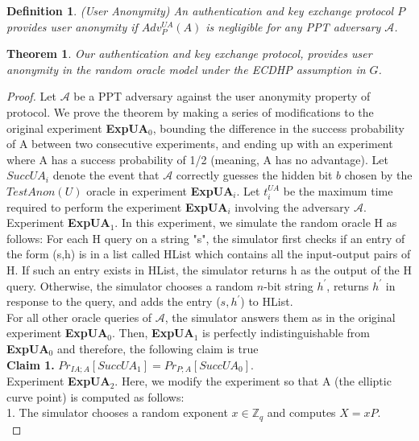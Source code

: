 \documentclass[a4paper,12pt]{report}
\newtheorem{theorem}{Theorem}
\newtheorem{definition}{Definition}
\begin{document}
\begin{definition}
(User Anonymity) An authentication and key exchange protocol $P$
provides user anonymity if $Adv^{UA}_P(A)$ is negligible for any PPT
adversary $\mathcal{A}$.
\end{definition}
\begin{theorem}
Our authentication and key exchange protocol, provides user anonymity in the
random oracle model under the \textit{ECDHP} assumption in $G$.
\end{theorem}

\begin{proof}
Let $\mathcal{A}$ be a PPT adversary against the user anonymity
property of protocol. We prove the theorem by making a series of
modifications to the original experiment \textbf{ExpUA$_0$},
bounding the difference in the success probability of A between two
consecutive experiments, and ending up with an experiment where A
has a success probability of 1/2 (meaning, A has no advantage). Let
$SuccUA_i$ denote the event that $\mathcal{A}$ correctly guesses the
hidden bit $b$ chosen by the $TestAnon(U)$ oracle in experiment
\textbf{ExpUA$_i$}. Let $t_i^{UA}$ be the maximum time required to
perform the experiment
\textbf{ExpUA$_i$} involving the adversary $\mathcal{A}$.\\
\linebreak Experiment \textbf{ExpUA$_1$}. In this experiment, we
simulate the random oracle H as follows: For each H query on a
string "s", the simulator first checks if an entry of the form (s,h)
is in a list called HList which contains all the input-output pairs
of H. If such an entry exists in HList, the simulator returns h as
the output of the H query. Otherwise, the simulator chooses a random
$n$-bit string $h^{\prime}$, returns $h^{\prime}$ in response to the
query, and adds the
entry ($s,h^{\prime}$) to HList.\\
For all other oracle queries of $\mathcal{A}$, the simulator answers
them as in the original experiment
\textbf{ExpUA$_0$}. Then, \textbf{ExpUA$_1$} is perfectly indistinguishable from \textbf{ExpUA$_0$} and therefore, the following claim is true\\
\textbf{Claim 1.} $Pr_{IA;A}[SuccUA_1] = Pr_{P;A}[SuccUA_0]$.\\
\linebreak
Experiment \textbf{ExpUA$_2$}. Here, we modify the experiment so that A (the elliptic curve point) is computed as follows:\\
1. The simulator chooses a random exponent $x \in \mathbb{Z}_q$ and computes $X = xP$.\\

\end{proof}
\end{document}
